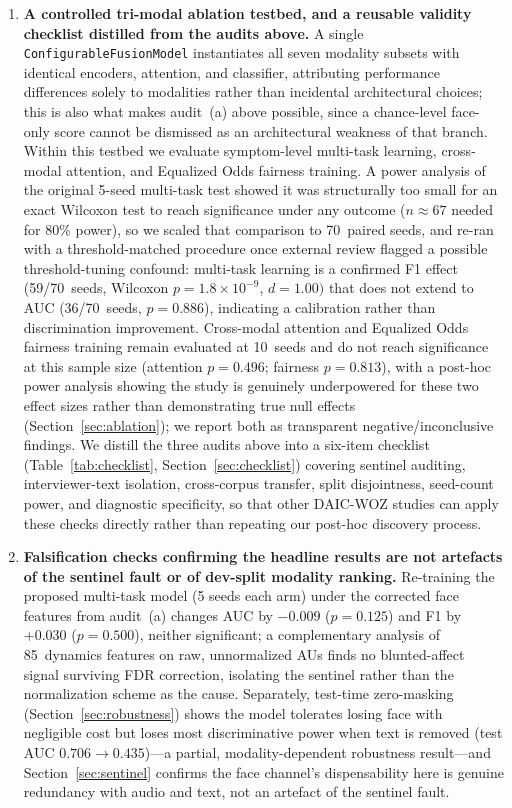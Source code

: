 \documentclass[5p,twocolumn]{elsarticle}
\begin{document}
\begin{enumerate}
  \item \textbf{A controlled tri-modal ablation testbed, and a
  reusable validity checklist distilled from the audits above.} A
  single \texttt{ConfigurableFusionModel} instantiates all seven
  modality subsets with identical encoders, attention, and classifier,
  attributing performance differences solely to modalities rather than
  incidental architectural choices; this is also what makes audit~(a)
  above possible, since a chance-level face-only score cannot be
  dismissed as an architectural weakness of that branch. Within this
  testbed we evaluate symptom-level multi-task learning, cross-modal
  attention, and Equalized Odds fairness training. A power analysis of
  the original 5-seed multi-task test showed it was structurally too
  small for an exact Wilcoxon test to reach significance under any
  outcome ($n{\approx}67$ needed for 80\% power), so we scaled that
  comparison to 70~paired seeds, and re-ran with a threshold-matched
  procedure once external review flagged a possible threshold-tuning
  confound: multi-task learning is a confirmed F1 effect
  (59/70~seeds, Wilcoxon $p{=}1.8{\times}10^{-9}$, $d{=}1.00)$ that
  does not extend to AUC (36/70~seeds, $p{=}0.886$), indicating a
  calibration rather than discrimination improvement.
  Cross-modal attention and Equalized Odds fairness training remain
  evaluated at 10~seeds and do not reach significance at this sample
  size (attention $p{=}0.496$; fairness $p{=}0.813$), with a post-hoc
  power analysis showing the study is genuinely underpowered for these
  two effect sizes rather than demonstrating true null effects
  (Section~\ref{sec:ablation}); we report both as transparent
  negative/inconclusive findings. We distill the three audits above
  into a six-item checklist (Table~\ref{tab:checklist},
  Section~\ref{sec:checklist}) covering sentinel auditing,
  interviewer-text isolation, cross-corpus transfer, split
  disjointness, seed-count power, and diagnostic specificity, so that
  other DAIC-WOZ studies can apply these checks directly rather than
  repeating our post-hoc discovery process.

  \item \textbf{Falsification checks confirming the headline results
  are not artefacts of the sentinel fault or of dev-split modality
  ranking.} Re-training the proposed multi-task model (5 seeds each
  arm) under the corrected face features from audit~(a) changes AUC by
  $-0.009$ ($p{=}0.125$) and F1 by $+0.030$ ($p{=}0.500$), neither
  significant; a complementary analysis of 85~dynamics features on
  raw, unnormalized AUs finds no blunted-affect signal surviving FDR
  correction, isolating the sentinel rather than the normalization
  scheme as the cause. Separately, test-time zero-masking
  (Section~\ref{sec:robustness}) shows the model tolerates losing face
  with negligible cost but loses most discriminative power when text
  is removed (test AUC $0.706\to0.435$)---a partial, modality-dependent
  robustness result---and Section~\ref{sec:sentinel} confirms the
  face channel's dispensability here is genuine redundancy with audio
  and text, not an artefact of the sentinel fault.


\end{enumerate}
\end{document}
